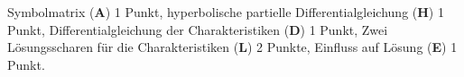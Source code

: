 \begin{bewertung}
Symbolmatrix ({\bf A}) 1 Punkt,
hyperbolische partielle Differentialgleichung ({\bf H}) 1 Punkt,
Differentialgleichung der Charakteristiken ({\bf D}) 1 Punkt,
Zwei Lösungsscharen für die Charakteristiken ({\bf L}) 2 Punkte,
Einfluss auf Lösung ({\bf E}) 1 Punkt.
\end{bewertung}



